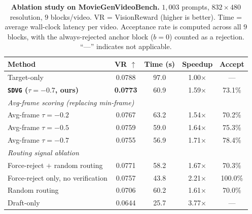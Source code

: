 \documentclass{article} %
\begin{document}

\begin{table}[t]
  \caption{%
    \textbf{Ablation study on MovieGenVideoBench.}
    $1{,}003$ prompts, $832{\times}480$ resolution, $9$ blocks/video.
    VR = VisionReward (higher is better).
    Time = average wall-clock latency per video.
    Acceptance rate is computed across all $9$ blocks, with the always-rejected anchor block ($b=0$) counted as a rejection.
    ``---'' indicates not applicable.
  }
  \label{tab:ablation}
  \centering
  \setlength{\tabcolsep}{13pt}
  \begin{tabular}{lcccc}
    \toprule
    Method & VR $\uparrow$ & Time (s) & Speedup & Accept \\
    \midrule
    Target-only                        & 0.0788 & 97.0 & 1.00$\times$ & ---    \\
    \midrule
    \textbf{\texttt{SDVG} ($\tau{=}{-}0.7$, ours)} & \textbf{0.0773} & 60.9 & 1.59$\times$ & 73.1\% \\
    \midrule
    \multicolumn{5}{l}{\textit{Avg-frame scoring (replacing min-frame)}} \\
    Avg-frame $\tau{=}{-}0.2$         & 0.0767 & 63.2 & 1.54$\times$ & 70.2\% \\
    Avg-frame $\tau{=}{-}0.5$         & 0.0759 & 59.0 & 1.64$\times$ & 75.3\% \\
    Avg-frame $\tau{=}{-}0.7$         & 0.0755 & 56.9 & 1.71$\times$ & 78.4\% \\
    \midrule
    \multicolumn{5}{l}{\textit{Routing signal ablation}} \\
    Force-reject $+$ random routing   & 0.0771 & 58.2 & 1.67$\times$ & 70.3\% \\
    Force-reject only, no verification & 0.0757 & 43.8 & 2.21$\times$ & 100.0\% \\
    Random routing                    & 0.0706 & 60.2  & 1.61$\times$ & 70.0\% \\
    \midrule
    Draft-only                         & 0.0644 & 25.7 & 3.77$\times$ & ---    \\
    \bottomrule
  \end{tabular}
\end{table}
\end{document}
